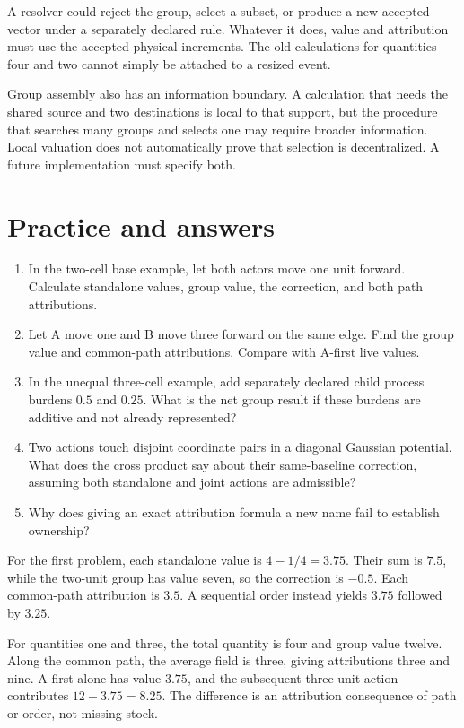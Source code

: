 A resolver could reject the group, select a subset, or produce a new accepted vector under a separately declared rule. Whatever it does, value and attribution must use the accepted physical increments. The old calculations for quantities four and two cannot simply be attached to a resized event.

Group assembly also has an information boundary. A calculation that needs the shared source and two destinations is local to that support, but the procedure that searches many groups and selects one may require broader information. Local valuation does not automatically prove that selection is decentralized. A future implementation must specify both.

\section{Practice and answers}

\begin{enumerate}
\item In the two-cell base example, let both actors move one unit forward. Calculate standalone values, group value, the correction, and both path attributions.
\item Let A move one and B move three forward on the same edge. Find the group value and common-path attributions. Compare with A-first live values.
\item In the unequal three-cell example, add separately declared child process burdens \(0.5\) and \(0.25\). What is the net group result if these burdens are additive and not already represented?
\item Two actions touch disjoint coordinate pairs in a diagonal Gaussian potential. What does the cross product say about their same-baseline correction, assuming both standalone and joint actions are admissible?
\item Why does giving an exact attribution formula a new name fail to establish ownership?
\end{enumerate}

For the first problem, each standalone value is \(4-1/4=3.75\). Their sum is \(7.5\), while the two-unit group has value seven, so the correction is \(-0.5\). Each common-path attribution is \(3.5\). A sequential order instead yields \(3.75\) followed by \(3.25\).

For quantities one and three, the total quantity is four and group value twelve. Along the common path, the average field is three, giving attributions three and nine. A first alone has value \(3.75\), and the subsequent three-unit action contributes \(12-3.75=8.25\). The difference is an attribution consequence of path or order, not missing stock.

